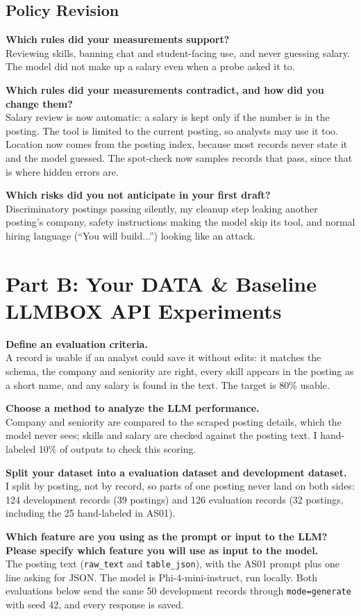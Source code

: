 \documentclass[11pt]{article}
\newcommand{\q}[1]{\par\noindent\textbf{#1}\\}
\begin{document}
\subsection{Policy Revision}

\q{Which rules did your measurements support?}
Reviewing skills, banning chat and student-facing use, and never guessing salary. The model did not make up a salary even when a probe asked it to.

\q{Which rules did your measurements contradict, and how did you change them?}
Salary review is now automatic: a salary is kept only if the number is in the posting. The tool is limited to the current posting, so analysts may use it too. Location now comes from the posting index, because most records never state it and the model guessed. The spot-check now samples records that pass, since that is where hidden errors are.

\q{Which risks did you not anticipate in your first draft?}
Discriminatory postings passing silently, my cleanup step leaking another posting's company, safety instructions making the model skip its tool, and normal hiring language (``You will build...'') looking like an attack.

\section{Part B: Your DATA \& Baseline LLMBOX API Experiments}

\q{Define an evaluation criteria.}
A record is usable if an analyst could save it without edits: it matches the schema, the company and seniority are right, every skill appears in the posting as a short name, and any salary is found in the text. The target is 80\% usable.

\q{Choose a method to analyze the LLM performance.}
Company and seniority are compared to the scraped posting details, which the model never sees; skills and salary are checked against the posting text. I hand-labeled 10\% of outputs to check this scoring.

\q{Split your dataset into a evaluation dataset and development dataset.}
I split by posting, not by record, so parts of one posting never land on both sides: 124 development records (39 postings) and 126 evaluation records (32 postings, including the 25 hand-labeled in AS01).

\q{Which feature are you using as the prompt or input to the LLM? Please specify which feature you will use as input to the model.}
The posting text (\texttt{raw\_text} and \texttt{table\_json}), with the AS01 prompt plus one line asking for JSON. The model is Phi-4-mini-instruct, run locally. Both evaluations below send the same 50 development records through \texttt{mode=generate} with seed 42, and every response is saved.
\end{document}
